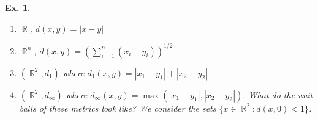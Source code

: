 \documentclass[12pt, a4paper]{book}
\DeclareMathOperator{\R}{\mathbb{R}}
\newtheorem{example}[theorem]{Ex.}
\theoremstyle{nonumberplain}
\begin{document}
\begin{example}\hspace{1cm}
    \begin{enumerate}
        \item $\R$, $d(x,y)=|x-y|$
        \item $\R^n$, $d(x,y)=\left( \sum\limits_{i=1}^n(x_i-y_i) \right)^{1/2}$
        \item $(\R^2,d_1)$ where $d_1(x,y)=|x_1-y_1|+|x_2-y_2|$
        \item $(\R^2,d_\infty)$ where $d_\infty(x,y)=\max(|x_1-y_1|,|x_2-y_2|)$.
            What do the unit balls of these metrics look like? We consider the sets $\{x\in\R^2:d(x,0)<1\}$.
            \begin{center}
\end{center}
\end{enumerate}
\end{example}
\end{document}

